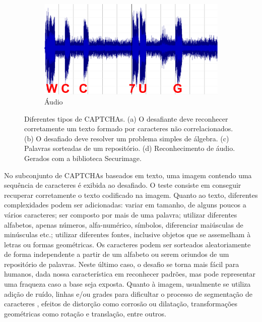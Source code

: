 \begin{figure}[ht]
\begin{subfigure}{.5\textwidth}
	\end{subfigure}
	\begin{subfigure}{.5\textwidth}
		\centering
		\includegraphics[width=.9\linewidth]{figuras/captcha_audio2.png}
		\caption{Áudio}
	\end{subfigure}
	\caption{Diferentes tipos de CAPTCHAs. (a) O desafiante deve reconhecer corretamente um texto formado por caracteres não correlacionados. (b) O desafiado deve resolver um problema simples de álgebra. (c) Palavras sorteadas de um repositório. (d) Reconhecimento de áudio. Gerados com a biblioteca Securimage.}
	\label{diffcaptchas}
\end{figure}

No subconjunto de CAPTCHAs baseados em texto, uma imagem contendo uma sequência de caracteres é exibida ao desafiado. O teste consiste em conseguir recuperar corretamente o texto codificado na imagem. Quanto ao texto, diferentes complexidades podem ser adicionadas: variar em tamanho, de alguns poucos a vários caracteres; ser composto por mais de uma palavra; utilizar diferentes alfabetos, apenas números, alfa-numérico, símbolos, diferenciar maiúsculas de minúsculas etc.; utilizar diferentes fontes, inclusive objetos que se assemelham à letras ou formas geométricas. Os caracteres podem ser sorteados aleatoriamente de forma independente a partir de um alfabeto ou serem oriundos de um repositório de palavras. Neste último caso, o desafio se torna mais fácil para humanos, dada nossa característica em reconhecer padrões, mas pode representar uma fraqueza caso a base seja exposta. Quanto à imagem, usualmente se utiliza adição de ruído, linhas e/ou grades para dificultar o processo de segmentação de caracteres \cite{lectures2005HIP}, efeitos de distorção como corrosão ou dilatação, transformações geométricas como rotação e translação, entre outros.  

